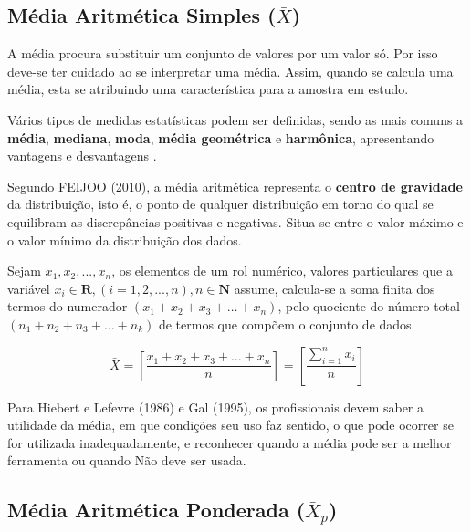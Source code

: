 \subsection{Média Aritmética Simples ($\bar{X}$)}

A média procura substituir um conjunto de valores por um valor só. Por isso
deve-se ter cuidado ao se interpretar uma média. Assim, quando se calcula uma média, esta se atribuindo
uma característica para a amostra em estudo.\vskip0.3cm

Vários tipos de medidas estatísticas podem ser definidas, sendo as mais comuns a \textbf{média}, \textbf{mediana}, \textbf{moda}, \textbf{média geométrica} e \textbf{harmônica}, apresentando vantagens e desvantagens
.\vskip0.3cm

Segundo FEIJOO (2010), a média aritmética representa o \textbf{centro de gravidade} da
distribuição, isto é, o ponto de qualquer distribuição em torno do qual se
equilibram as discrepâncias positivas e negativas. Situa-se entre o valor máximo e o valor mínimo da distribuição dos dados.\vskip0.3cm


Sejam $x_{1}, x_{2}, ..., x_{n}$, os elementos de um rol numérico, valores particulares que a variável $x_{i} \in \mathbf{R}, (i=1,2,...,n), n \in \mathbf{N} $ assume, calcula-se a soma finita dos termos do numerador $(x_{1}+x_{2}+x_{3}+\ldots+x_{n})$,  pelo quociente do número total $(n_{1}+n_{2}+n_{3}+\ldots+n_{k})$ de termos que compõem o conjunto de dados.\vskip0.3cm


\begin{equation}\label{media1}
\bar{X}= \left[ \frac{x_{1}+x_{2}+x_{3}+\ldots+x_{n}}{n} \right ] = \left[ \frac{\sum_{i=1}^{n}x_{i}}{n} \right ]
\end{equation}

\newpage
Para Hiebert e Lefevre (1986) e Gal (1995), os profissionais devem saber a utilidade da média, em que condições seu uso faz sentido, o que pode ocorrer se for utilizada inadequadamente, e reconhecer quando a média pode ser a melhor ferramenta ou quando Não deve ser usada.






\subsection{Média Aritmética Ponderada ($\bar{X}_{p}$)}

